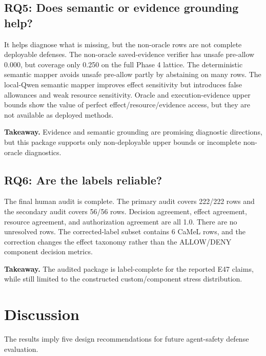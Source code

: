 \documentclass[11pt]{article}
\newcommand{\allow}{\textsc{ALLOW}}
\newcommand{\deny}{\textsc{DENY}}
\begin{document}
\subsection{RQ5: Does semantic or evidence grounding help?}
It helps diagnose what is missing, but the non-oracle rows are not complete deployable defenses. The non-oracle saved-evidence verifier has unsafe pre-allow 0.000, but coverage only 0.250 on the full Phase 4 lattice. The deterministic semantic mapper avoids unsafe pre-allow partly by abstaining on many rows. The local-Qwen semantic mapper improves effect sensitivity but introduces false allowances and weak resource sensitivity. Oracle and execution-evidence upper bounds show the value of perfect effect/resource/evidence access, but they are not available as deployed methods.

\textbf{Takeaway.} Evidence and semantic grounding are promising diagnostic directions, but this package supports only non-deployable upper bounds or incomplete non-oracle diagnostics.

\subsection{RQ6: Are the labels reliable?}
The final human audit is complete. The primary audit covers 222/222 rows and the secondary audit covers 56/56 rows. Decision agreement, effect agreement, resource agreement, and authorization agreement are all 1.0. There are no unresolved rows. The corrected-label subset contains 6 CaMeL rows, and the correction changes the effect taxonomy rather than the \allow{}/\deny{} component decision metrics.

\textbf{Takeaway.} The audited package is label-complete for the reported E47 claims, while still limited to the constructed custom/component stress distribution.

\section{Discussion}
The results imply five design recommendations for future agent-safety defense evaluation.
\end{document}
